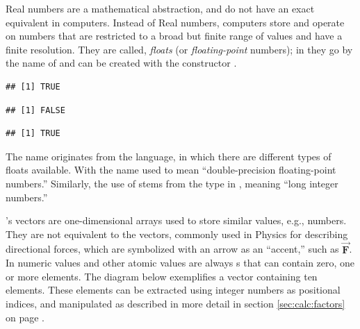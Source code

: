 \documentclass[krantz2]{krantz}\usepackage{knitr}
\begin{document}
\begin{explainbox}
Real numbers are a mathematical abstraction, and do not have an exact equivalent in computers. Instead of Real numbers, computers store and operate on numbers that are restricted to a broad but finite range of values and have a finite resolution. They are called, \emph{floats} (or \emph{floating-point} numbers); in \Rlang they go by the name of  and can be created with the constructor .

\begin{knitrout}\footnotesize
{}\color{fgcolor}\begin{kframe}
\begin{alltt}
\hlstd{(}\hlstd{)}
\end{alltt}
\begin{verbatim}
## [1] TRUE
\end{verbatim}
\begin{alltt}
\hlstd{(}\hlstd{)}
\end{alltt}
\begin{verbatim}
## [1] FALSE
\end{verbatim}
\begin{alltt}
\hlstd{(}\hlstd{)}
\end{alltt}
\begin{verbatim}
## [1] TRUE
\end{verbatim}
\end{kframe}
\end{knitrout}

The name  originates from the \Clang language, in which there are different types of floats available. With the name  used to mean ``double-precision floating-point numbers.'' Similarly, the use of  stems from the  type in \Clang, meaning ``long integer numbers.''
\end{explainbox}

\Rlang's vectors\label{par:numeric:vectors:start} are one-dimensional arrays used to store similar values, e.g., numbers. They are not equivalent to the vectors, commonly used in Physics for describing directional forces, which are symbolized with an arrow as an ``accent,'' such as $\overrightarrow{\mathbf{F}}$. In \Rlang numeric values and other atomic values are always s that can contain zero, one or more elements. The diagram below exemplifies a vector containing ten elements. These elements can be extracted using integer numbers as positional indices, and manipulated as described in more detail in section \ref{sec:calc:factors} on page \pageref{sec:calc:factors}.\vspace{1ex}
\end{document}
